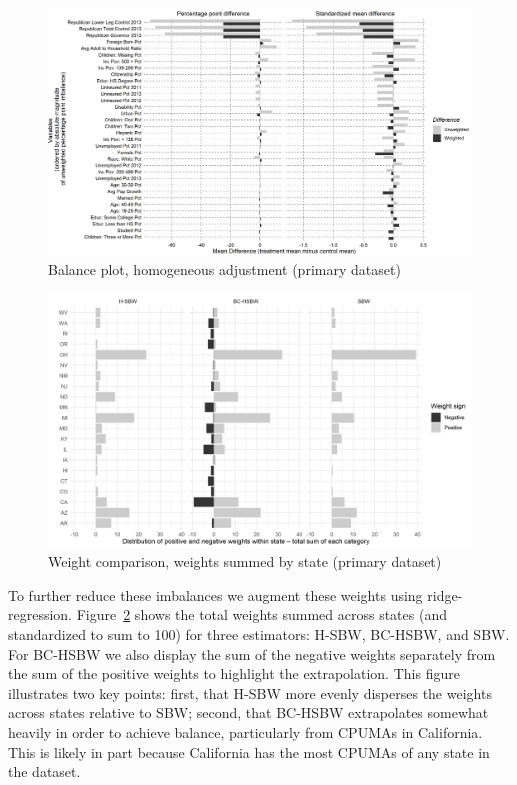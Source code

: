 \documentclass[aoas]{imsart}
\theoremstyle{plain}
\theoremstyle{remark}
\begin{document}
\begin{figure}[H]
\begin{center}
    \caption{Balance plot, homogeneous adjustment (primary dataset)}\label{fig:loveplotc1a}
    \includegraphics[scale=0.45]{01_Plots/balance-plot-all-etu-c1.png}
\end{center}
\end{figure}

\begin{figure}[H]
\begin{center}
    \caption{Weight comparison, weights summed by state (primary dataset)}
    \label{fig:sbwvhsbw1}
    \includegraphics[scale=0.55]{01_Plots/weights-by-state-sbw-hsbw-c1.png}
\end{center}
\end{figure}

To further reduce these imbalances we augment these weights using ridge-regression. Figure~\ref{fig:sbwvhsbw1} shows the total weights summed across states (and standardized to sum to 100) for three estimators: H-SBW, BC-HSBW, and SBW. For BC-HSBW we also display the sum of the negative weights separately from the sum of the positive weights to highlight the extrapolation. This figure illustrates two key points: first, that H-SBW more evenly disperses the weights across states relative to SBW; second, that BC-HSBW extrapolates somewhat heavily in order to achieve balance, particularly from CPUMAs in California. This is likely in part because California has the most CPUMAs of any state in the dataset.
\end{document}
